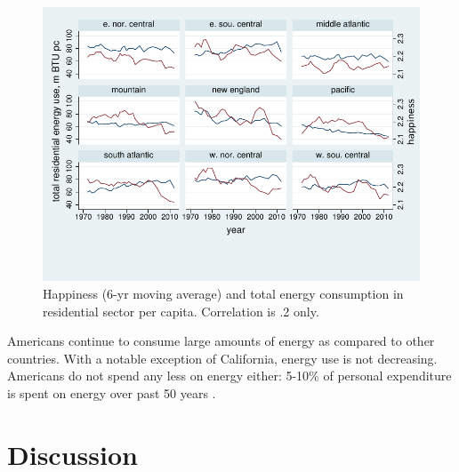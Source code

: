 \documentclass[10pt, letterpaper]{article}
\begin{document}
\begin{spacing}{1.4}
\begin{figure}[H]
 \includegraphics[width=5in]{graphsAndTables/cenDivLsYrSmINKSCAPE.pdf}\centering
\caption{Happiness (6-yr moving average) and total energy consumption
  in residential sector per capita. Correlation is .2 only.
}\label{cenDivLsYrSm}
\end{figure}

Americans continue to consume large amounts of energy as compared to other
countries.  With a notable exception of California, energy use is
not decreasing. %
 Americans do not spend any less  on energy either: 5-10\% of personal
expenditure is spent on energy over past 50 years %
 \cite{bea-2-8-5}.


\section*{\large \bf Discussion}



\end{spacing}
\end{document}
